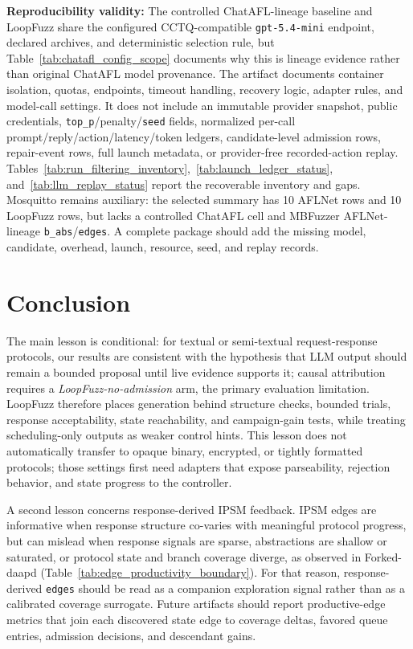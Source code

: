 \documentclass[final,5p,times,number]{elsarticle}
\begin{document}
\textbf{Reproducibility validity:} The controlled ChatAFL-lineage baseline and LoopFuzz share the configured CCTQ-compatible \texttt{gpt-5.4-mini} endpoint, declared archives, and deterministic selection rule, but Table~\ref{tab:chatafl_config_scope} documents why this is lineage evidence rather than original ChatAFL model provenance. The artifact documents container isolation, quotas, endpoints, timeout handling, recovery logic, adapter rules, and model-call settings. It does not include an immutable provider snapshot, public credentials, \texttt{top\_p}/penalty/\texttt{seed} fields, normalized per-call prompt/reply/action/latency/token ledgers, candidate-level admission rows, repair-event rows, full launch metadata, or provider-free recorded-action replay. Tables~\ref{tab:run_filtering_inventory},~\ref{tab:launch_ledger_status}, and~\ref{tab:llm_replay_status} report the recoverable inventory and gaps. Mosquitto remains auxiliary: the selected summary has 10 AFLNet rows and 10 LoopFuzz rows, but lacks a controlled ChatAFL cell and MBFuzzer AFLNet-lineage \texttt{b\_abs}/\texttt{edges}. A complete package should add the missing model, candidate, overhead, launch, resource, seed, and replay records.

\section{Conclusion}
The main lesson is conditional: for textual or semi-textual request-response protocols, our results are consistent with the hypothesis that LLM output should remain a bounded proposal until live evidence supports it; causal attribution requires a \emph{LoopFuzz-no-admission} arm, the primary evaluation limitation. LoopFuzz therefore places generation behind structure checks, bounded trials, response acceptability, state reachability, and campaign-gain tests, while treating scheduling-only outputs as weaker control hints. This lesson does not automatically transfer to opaque binary, encrypted, or tightly formatted protocols; those settings first need adapters that expose parseability, rejection behavior, and state progress to the controller.

A second lesson concerns response-derived IPSM feedback. IPSM edges are informative when response structure co-varies with meaningful protocol progress, but can mislead when response signals are sparse, abstractions are shallow or saturated, or protocol state and branch coverage diverge, as observed in Forked-daapd (Table~\ref{tab:edge_productivity_boundary}). For that reason, response-derived \texttt{edges} should be read as a companion exploration signal rather than as a calibrated coverage surrogate. Future artifacts should report productive-edge metrics that join each discovered state edge to coverage deltas, favored queue entries, admission decisions, and descendant gains.
\end{document}
